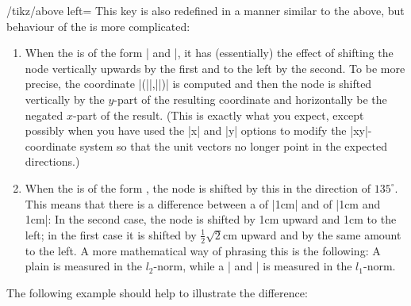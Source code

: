 \begin{key}{/tikz/above left=}
    This key is also redefined in a manner similar to the above, but behaviour
    of the  is more complicated:
    \begin{enumerate}
        \item When the  is of the form
            | and |, it has
            (essentially) the effect of shifting the node vertically upwards by
            the first  and to the left by the second.
            To be more precise, the coordinate |(||,||)| is computed and
            then the node is shifted vertically by the $y$-part of the
            resulting coordinate and horizontally be the negated $x$-part of
            the result. (This is exactly what you expect, except possibly when
            you have used the |x| and |y| options to modify the |xy|-coordinate
            system so that the unit  vectors no longer point in the expected
            directions.)
        \item When the  is of the form , the node is shifted by this 
            in the direction of $135^\circ$. This means that there is a
            difference between a  of |1cm| and of
            |1cm and 1cm|: In the second case, the node is shifted by 1cm
            upward and 1cm to the left; in the first case it is shifted by
            $\frac{1}{2}\sqrt{2}$cm upward and by the same amount to the left.
            A more mathematical way of phrasing this is the following: A plain
             is measured in the $l_2$-norm, while a
            | and | is measured in the
            $l_1$-norm.
    \end{enumerate}
    The following example should help to illustrate the difference:
\begin{codeexample}[preamble={\usetikzlibrary{positioning}}]
\end{codeexample}
\end{key}
